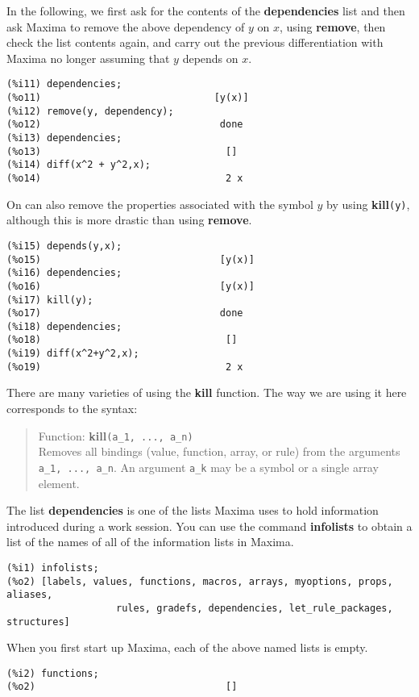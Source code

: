 \documentclass[12pt]{article}
\begin{document}
In the following, we first ask for the contents of the \textbf{dependencies} list
  and then ask Maxima to remove the above dependency of $y$ on $x$, using
  \textbf{remove}, then check the list contents again, and carry out the previous
  differentiation with Maxima no longer assuming that $y$ depends on $x$.
\small
\begin{verbatim}
(%i11) dependencies;
(%o11)                              [y(x)]
(%i12) remove(y, dependency);
(%o12)                               done
(%i13) dependencies;
(%o13)                                []
(%i14) diff(x^2 + y^2,x);
(%o14)                                2 x
\end{verbatim}
\normalsize
On can also remove the properties associated with the symbol $y$ by using
  \textbf{kill}\verb|(y)|, although this is more drastic than using \textbf{remove}.
\small
\begin{verbatim}
(%i15) depends(y,x);
(%o15)                               [y(x)]
(%i16) dependencies;
(%o16)                               [y(x)]
(%i17) kill(y);
(%o17)                               done
(%i18) dependencies;
(%o18)                                []
(%i19) diff(x^2+y^2,x);
(%o19)                                2 x
\end{verbatim}
\normalsize
There are many varieties of using the \textbf{kill} function.
The way we are using it here corresponds to the syntax:\\
\small
\begin{quote}
Function: \textbf{kill}\verb|(a_1, ..., a_n) |\\
Removes all bindings (value, function, array, or rule) from the
  arguments \verb|a_1, ..., a_n|.
An argument \verb|a_k| may be a symbol or a single array element.
\end{quote}
\normalsize
The list \textbf{dependencies} is one of the lists Maxima uses to hold information
  introduced during a work session. 
You can use the command \textbf{infolists} to obtain a list of the names of all
 of the information lists in Maxima.
\small
\begin{verbatim}
(%i1) infolists;
(%o2) [labels, values, functions, macros, arrays, myoptions, props, aliases, 
                   rules, gradefs, dependencies, let_rule_packages, structures]
\end{verbatim}
\normalsize
When you first start up Maxima, each of the above named lists is empty.
\small
\begin{verbatim}
(%i2) functions;
(%o2)                                 []
\end{verbatim}
\normalsize
\end{document}

